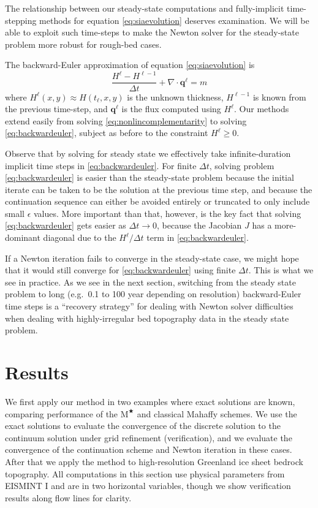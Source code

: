 \documentclass[twocolumn,a4paper]{igs}
\newcommand\bq{\mathbf{q}}
\newcommand{\Div}{\nabla\cdot}
\newcommand\eps{\epsilon}
\newcommand{\Mstar}{$\text{M}^{\bigstar}$\xspace}
\begin{document}
The relationship between our steady-state computations and fully-implicit time-stepping methods for equation \eqref{eq:siaevolution} deserves examination.  We will be able to exploit such time-steps to make the Newton solver for the steady-state problem more robust for rough-bed cases.

The backward-Euler \citep{MortonMayers2005} approximation of equation \eqref{eq:siaevolution} is
\begin{equation}
\frac{H^\ell - H^{\ell-1}}{\Delta t} + \Div \bq^\ell = m \label{eq:backwardeuler}
\end{equation}
where $H^\ell(x,y) \approx H(t_\ell,x,y)$ is the unknown thickness, $H^{\ell-1}$ is known from the previous time-step, and $\bq^\ell$ is the flux computed using $H^\ell$.  Our methods extend easily from solving \eqref{eq:nonlincomplementarity} to solving \eqref{eq:backwardeuler}, subject as before to the constraint $H^\ell\ge 0$.

Observe that by solving for steady state we effectively take infinite-duration implicit time steps in \eqref{eq:backwardeuler}.  For finite $\Delta t$, solving problem \eqref{eq:backwardeuler} is easier than the steady-state problem because the initial iterate can be taken to be the solution at the previous time step, and because the continuation sequence can either be avoided entirely or truncated to only include small $\eps$ values.  More important than that, however, is the key fact that solving \eqref{eq:backwardeuler} gets easier as $\Delta t\to 0$, because the Jacobian $J$ has a more-dominant diagonal due to the $H^\ell/\Delta t$ term in \eqref{eq:backwardeuler}.

If a Newton iteration fails to converge in the steady-state case, we might hope that it would still converge for \eqref{eq:backwardeuler} using finite $\Delta t$.  This is what we see in practice.  As we see in the next section, switching from the steady state problem to long (e.g.~0.1 to 100 year depending on resolution) backward-Euler time steps is a ``recovery strategy'' for dealing with Newton solver difficulties when dealing with highly-irregular bed topography data in the steady state problem.


\section{Results}

We first apply our method in two examples where exact solutions are known, comparing performance of the \Mstar and classical Mahaffy schemes.  We use the exact solutions to evaluate the convergence of the discrete solution to the continuum solution under grid refinement (verification), and we evaluate the convergence of the continuation scheme and Newton iteration in these cases.  After that we apply the method to high-resolution Greenland ice sheet bedrock topography.  All computations in this section use physical parameters from EISMINT I \citep{Huybrechtsetal1996} and are in two horizontal variables, though we show verification results along flow lines for clarity.
\end{document}
